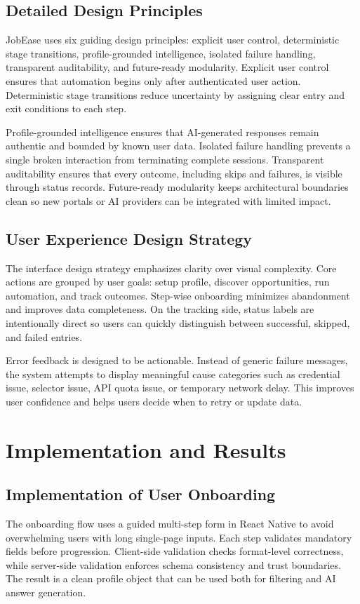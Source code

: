 \documentclass[12pt,a4paper,oneside]{report}
\begin{document}
\section{Detailed Design Principles}
JobEase uses six guiding design principles: explicit user control, deterministic stage transitions, profile-grounded intelligence, isolated failure handling, transparent auditability, and future-ready modularity. Explicit user control ensures that automation begins only after authenticated user action. Deterministic stage transitions reduce uncertainty by assigning clear entry and exit conditions to each step.

Profile-grounded intelligence ensures that AI-generated responses remain authentic and bounded by known user data. Isolated failure handling prevents a single broken interaction from terminating complete sessions. Transparent auditability ensures that every outcome, including skips and failures, is visible through status records. Future-ready modularity keeps architectural boundaries clean so new portals or AI providers can be integrated with limited impact.

\section{User Experience Design Strategy}
The interface design strategy emphasizes clarity over visual complexity. Core actions are grouped by user goals: setup profile, discover opportunities, run automation, and track outcomes. Step-wise onboarding minimizes abandonment and improves data completeness. On the tracking side, status labels are intentionally direct so users can quickly distinguish between successful, skipped, and failed entries.

Error feedback is designed to be actionable. Instead of generic failure messages, the system attempts to display meaningful cause categories such as credential issue, selector issue, API quota issue, or temporary network delay. This improves user confidence and helps users decide when to retry or update data.

\chapter{Implementation and Results}
\section{Implementation of User Onboarding}
The onboarding flow uses a guided multi-step form in React Native to avoid overwhelming users with long single-page inputs. Each step validates mandatory fields before progression. Client-side validation checks format-level correctness, while server-side validation enforces schema consistency and trust boundaries. The result is a clean profile object that can be used both for filtering and AI answer generation.
\end{document}
